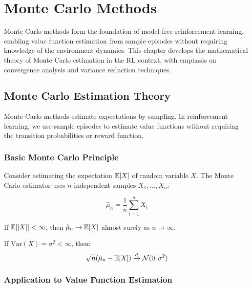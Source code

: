 \chapter{Monte Carlo Methods}
\label{ch:monte-carlo}

Monte Carlo methods form the foundation of model-free reinforcement learning, enabling value function estimation from sample episodes without requiring knowledge of the environment dynamics. This chapter develops the mathematical theory of Monte Carlo estimation in the RL context, with emphasis on convergence analysis and variance reduction techniques.

\section{Monte Carlo Estimation Theory}

Monte Carlo methods estimate expectations by sampling. In reinforcement learning, we use sample episodes to estimate value functions without requiring the transition probabilities or reward function.

\subsection{Basic Monte Carlo Principle}

Consider estimating the expectation $\mathbb{E}[X]$ of random variable $X$. The Monte Carlo estimator uses $n$ independent samples $X_1, \ldots, X_n$:

\begin{equation}
\hat{\mu}_n = \frac{1}{n} \sum_{i=1}^n X_i
\end{equation}

\begin{theorem}
If $\mathbb{E}[|X|] < \infty$, then $\hat{\mu}_n \to \mathbb{E}[X]$ almost surely as $n \to \infty$.
\end{theorem}

\begin{theorem}
If $\text{Var}(X) = \sigma^2 < \infty$, then:
\begin{equation}
\sqrt{n}(\hat{\mu}_n - \mathbb{E}[X]) \xrightarrow{d} \mathcal{N}(0, \sigma^2)
\end{equation}
\end{theorem}

\subsection{Application to Value Function Estimation}

